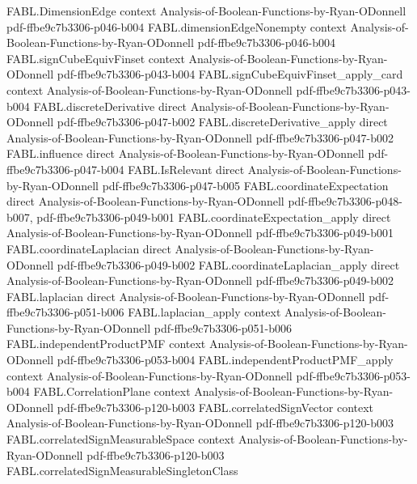 \begin{theorem}
\proofstep
  {FABL.DimensionEdge}
  {context}
  {Analysis-of-Boolean-Functions-by-Ryan-ODonnell}
  {pdf-ffbe9c7b3306-p046-b004}
\proofstep
  {FABL.dimensionEdgeNonempty}
  {context}
  {Analysis-of-Boolean-Functions-by-Ryan-ODonnell}
  {pdf-ffbe9c7b3306-p046-b004}
\proofstep
  {FABL.signCubeEquivFinset}
  {context}
  {Analysis-of-Boolean-Functions-by-Ryan-ODonnell}
  {pdf-ffbe9c7b3306-p043-b004}
\proofstep
  {FABL.signCubeEquivFinset_apply_card}
  {context}
  {Analysis-of-Boolean-Functions-by-Ryan-ODonnell}
  {pdf-ffbe9c7b3306-p043-b004}
\proofstep
  {FABL.discreteDerivative}
  {direct}
  {Analysis-of-Boolean-Functions-by-Ryan-ODonnell}
  {pdf-ffbe9c7b3306-p047-b002}
\proofstep
  {FABL.discreteDerivative_apply}
  {direct}
  {Analysis-of-Boolean-Functions-by-Ryan-ODonnell}
  {pdf-ffbe9c7b3306-p047-b002}
\proofstep
  {FABL.influence}
  {direct}
  {Analysis-of-Boolean-Functions-by-Ryan-ODonnell}
  {pdf-ffbe9c7b3306-p047-b004}
\proofstep
  {FABL.IsRelevant}
  {direct}
  {Analysis-of-Boolean-Functions-by-Ryan-ODonnell}
  {pdf-ffbe9c7b3306-p047-b005}
\proofstep
  {FABL.coordinateExpectation}
  {direct}
  {Analysis-of-Boolean-Functions-by-Ryan-ODonnell}
  {pdf-ffbe9c7b3306-p048-b007,
    pdf-ffbe9c7b3306-p049-b001}
\proofstep
  {FABL.coordinateExpectation_apply}
  {direct}
  {Analysis-of-Boolean-Functions-by-Ryan-ODonnell}
  {pdf-ffbe9c7b3306-p049-b001}
\proofstep
  {FABL.coordinateLaplacian}
  {direct}
  {Analysis-of-Boolean-Functions-by-Ryan-ODonnell}
  {pdf-ffbe9c7b3306-p049-b002}
\proofstep
  {FABL.coordinateLaplacian_apply}
  {direct}
  {Analysis-of-Boolean-Functions-by-Ryan-ODonnell}
  {pdf-ffbe9c7b3306-p049-b002}
\proofstep
  {FABL.laplacian}
  {direct}
  {Analysis-of-Boolean-Functions-by-Ryan-ODonnell}
  {pdf-ffbe9c7b3306-p051-b006}
\proofstep
  {FABL.laplacian_apply}
  {context}
  {Analysis-of-Boolean-Functions-by-Ryan-ODonnell}
  {pdf-ffbe9c7b3306-p051-b006}
\proofstep
  {FABL.independentProductPMF}
  {context}
  {Analysis-of-Boolean-Functions-by-Ryan-ODonnell}
  {pdf-ffbe9c7b3306-p053-b004}
\proofstep
  {FABL.independentProductPMF_apply}
  {context}
  {Analysis-of-Boolean-Functions-by-Ryan-ODonnell}
  {pdf-ffbe9c7b3306-p053-b004}
\proofstep
  {FABL.CorrelationPlane}
  {context}
  {Analysis-of-Boolean-Functions-by-Ryan-ODonnell}
  {pdf-ffbe9c7b3306-p120-b003}
\proofstep
  {FABL.correlatedSignVector}
  {context}
  {Analysis-of-Boolean-Functions-by-Ryan-ODonnell}
  {pdf-ffbe9c7b3306-p120-b003}
\proofstep
  {FABL.correlatedSignMeasurableSpace}
  {context}
  {Analysis-of-Boolean-Functions-by-Ryan-ODonnell}
  {pdf-ffbe9c7b3306-p120-b003}
\proofstep
  {FABL.correlatedSignMeasurableSingletonClass}

\end{theorem}
